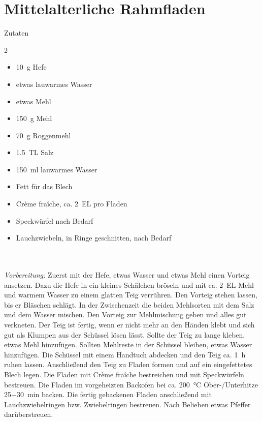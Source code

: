 \section*{Mittelalterliche Rahmfladen}
\ihead{}\ohead{}
\cfoot{}
{\Large Zutaten}
\begin{multicols}{2}
\begin{itemize}
\item \SI{10}{g} Hefe
\item etwas lauwarmes Wasser
\item etwas Mehl
\item \SI{150}{g} Mehl
\item \SI{70}{g} Roggenmehl
\item \SI{1,5}{TL} Salz
\item \SI{150}{ml} lauwarmes Wasser
\item Fett für das Blech
\item Crème fraîche, ca. \SI{2}{EL} pro Fladen
\item Speckwürfel nach Bedarf
\item Lauchzwiebeln, in Ringe geschnitten, nach Bedarf
\end{itemize}
\end{multicols}
\\
\\
\textit{Vorbereitung:} Zuerst mit der Hefe, etwas Wasser und etwas Mehl einen Vorteig ansetzen.
Dazu die Hefe in ein kleines Schälchen bröseln und mit ca. \SI{2}{EL} Mehl und warmem Wasser zu einem glatten Teig verrühren.
Den Vorteig stehen lassen, bis er Bläschen schlägt.
In der Zwischenzeit die beiden Mehlsorten mit dem Salz und dem Wasser mischen.
Den Vorteig zur Mehlmischung geben und alles gut verkneten.
Der Teig ist fertig, wenn er nicht mehr an den Händen klebt und sich gut als Klumpen aus der Schüssel lösen lässt.
Sollte der Teig zu lange kleben, etwas Mehl hinzufügen.
Sollten Mehlreste in der Schüssel bleiben, etwas Wasser hinzufügen.
Die Schüssel mit einem Handtuch abdecken und den Teig ca. \SI{1}{h} ruhen lassen.
Anschließend den Teig zu Fladen formen und auf ein eingefettetes Blech legen.
Die Fladen mit Crème fraîche bestreichen und mit Speckwürfeln bestreuen.
Die Fladen im vorgeheizten Backofen bei ca. \SI{200}{\celsius} Ober-/Unterhitze \SI{25-30}{min} backen.
Die fertig gebackenen Fladen anschließend mit Lauchzwiebelringen bzw. Zwiebelringen bestreuen.
Nach Belieben etwas Pfeffer darüberstreuen.

